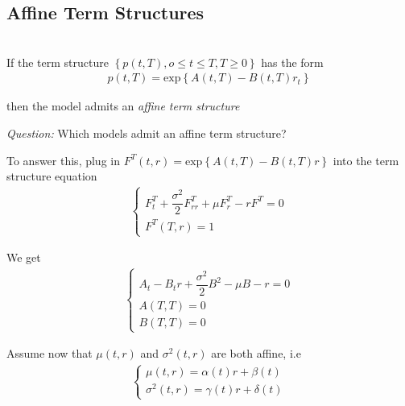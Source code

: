 \subsection{Affine Term Structures}\hfill\\
If the term structure $\left\{p(t,T),o\leq t\leq T, T\geq0\right\}$ has the form
\begin{equation*}
  \begin{gathered}
    p(t,T) = \text{exp}\left\{A(t,T)-B(t,T)r_t\right\}
  \end{gathered}
\end{equation*}\par
\noindent then the model admits an \textit{affine term structure}
\par\bigskip
\noindent\textit{Question:} Which models admit an affine term structure?\par
\noindent To answer this, plug in $F^T(t,r) = \text{exp}\left\{A(t,T)-B(t,T)r\right\}$ into the term structure equation
\begin{equation*}
  \begin{gathered}
    \begin{cases}
      F_t^T+\dfrac{\sigma^2}{2}F_{rr}^T+\mu F_r^T-rF^T=0\\
      F^T(T,r) = 1
    \end{cases}
  \end{gathered}
\end{equation*}\par
\noindent We get
\begin{equation*}
  \begin{gathered}
    \begin{cases}
      A_t-B_tr+\dfrac{\sigma^2}{2}B^2-\mu B-r=0\\
      A(T,T) = 0\\
      B(T,T) = 0
    \end{cases}
  \end{gathered}
\end{equation*}\par
\noindent Assume now that $\mu(t,r)$ and $\sigma^2(t,r)$ are both affine, i.e
\begin{equation}
  \begin{gathered}
    \begin{cases}
       \mu(t,r) = \alpha(t)r+\beta(t)\\
       \sigma^2(t,r) = \gamma(t)r+\delta(t)
    \end{cases}
  \end{gathered}
\end{equation}\par
